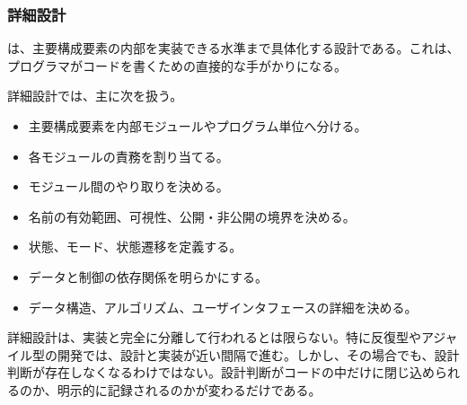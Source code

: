 \subsubsection{詳細設計}

 は、主要構成要素の内部を実装できる水準まで具体化する設計である。これは、プログラマがコードを書くための直接的な手がかりになる。

詳細設計では、主に次を扱う。
\begin{itemize}
  \item 主要構成要素を内部モジュールやプログラム単位へ分ける。
  \item 各モジュールの責務を割り当てる。
  \item モジュール間のやり取りを決める。
  \item 名前の有効範囲、可視性、公開・非公開の境界を決める。
  \item 状態、モード、状態遷移を定義する。
  \item データと制御の依存関係を明らかにする。
  \item データ構造、アルゴリズム、ユーザインタフェースの詳細を決める。
\end{itemize}

詳細設計は、実装と完全に分離して行われるとは限らない。特に反復型やアジャイル型の開発では、設計と実装が近い間隔で進む。しかし、その場合でも、設計判断が存在しなくなるわけではない。設計判断がコードの中だけに閉じ込められるのか、明示的に記録されるのかが変わるだけである。
